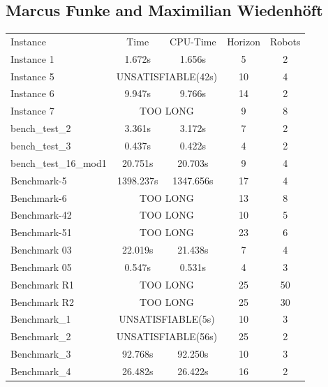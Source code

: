 \documentclass[runningheads]{llncs}
\begin{document}
\subsection{Marcus Funke and Maximilian Wiedenhöft}
\begin{tabular}[h]{l|c|c|c|c}
Instance & Time & CPU-Time & Horizon &  Robots \\
Instance 1 & 1.672s & 1.656s & 5 & 2 \\
Instance 5 & \multicolumn{2}{c|}{UNSATISFIABLE(42s)} & 10 & 4 \\
Instance 6 & 9.947s & 9.766s & 14 & 2 \\
Instance 7 & \multicolumn{2}{c|}{TOO LONG} & 9  & 8 \\
bench\_test\_2 & 3.361s & 3.172s & 7 & 2 \\
bench\_test\_3 & 0.437s & 0.422s & 4 & 2 \\
bench\_test\_16\_mod1 & 20.751s & 20.703s & 9 & 4 \\
Benchmark-5 & 1398.237s & 1347.656s & 17 & 4 \\
Benchmark-6 & \multicolumn{2}{c|}{TOO LONG} & 13 & 8 \\
Benchmark-42 & \multicolumn{2}{c|}{TOO LONG} & 10  & 5 \\ 
Benchmark-51 & \multicolumn{2}{c|}{TOO LONG} & 23 & 6 \\
Benchmark 03 & 22.019s & 21.438s & 7 & 4 \\
Benchmark 05 & 0.547s & 0.531s & 4 & 3 \\
Benchmark R1 &\multicolumn{2}{c|}{TOO LONG} & 25 & 50 \\
Benchmark R2 & \multicolumn{2}{c|}{TOO LONG} & 25 & 30 \\
Benchmark\_1 & \multicolumn{2}{c|}{UNSATISFIABLE(5s)} & 10 & 3 \\ 
Benchmark\_2 & \multicolumn{2}{c|}{UNSATISFIABLE(56s)} & 25 & 2 \\
Benchmark\_3 & 92.768s & 92.250s & 10 & 3 \\
Benchmark\_4 & 26.482s & 26.422s & 16 & 2 \\
\end{tabular}
\end{document}

